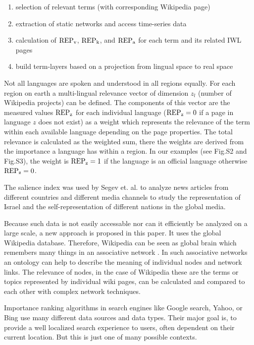 \documentclass[a4paper,10pt]{scrbook}
\begin{document}
\begin{enumerate}
 \item selection of relevant terms (with corresponding Wikipedia page)
 \item extraction of static networks and access time-series data
 \item calculation of $\rm REP_v$, $\rm REP_k$, and $\rm REP_a$ for each term
and its
related IWL pages
 \item build term-layers based on a projection from lingual space to real space
\end{enumerate}

Not all languages are spoken and understood in all regions equally. For each
region on earth a multi-lingual relevance vector of dimension $z_l$ (number
of Wikipedia projects) can be defined. The components of this vector are the
measured values $\rm REP_z$ for each individual language ($\rm REP_z = 0$ if a
page in language $z$ does not exist) as a weight which represents the relevance
of the term within each available language depending on the page properties.
The total relevance is calculated as the weighted sum, there the weights are
derived from the importance a language has within a region. In our examples (see
Fig.S2 and Fig.S3), the weight is $\rm REP_z=1$ if the language is an official
language otherwise $\rm REP_z=0$.


\label{ext.fig.SemanticSearch} 

 

The salience index was used by Segev et. al. \cite{Segev2010} to analyze news
articles from different countries and different media channels to study the
representation of Israel and the self-representation of different nations in the
global media.

Because such data is not easily accessable nor can it efficiently be analyzed on
a large scale, a new approach is proposed in this paper. It  uses the global
Wikipedia database. Therefore, Wikipedia can be seen as global brain which
remembers many things in an associative network
\cite{Schnabl.1972,Russell.1983}. In such
associative
networks an ontology can help to describe the meaning of individual nodes and
network links. The relevance of nodes, in the case of
Wikipedia these are the terms or topics represented by individual wiki pages,
can be calculated and compared to each other with complex network techniques. 
 
Importance ranking algorithms in search engines like Google search, Yahoo, or
Bing use many different data sources and data types. Their major goal is, to
provide a well localized search experience to users, often dependent on their
current location. But this is just one of many possible contexts.
\end{document}
